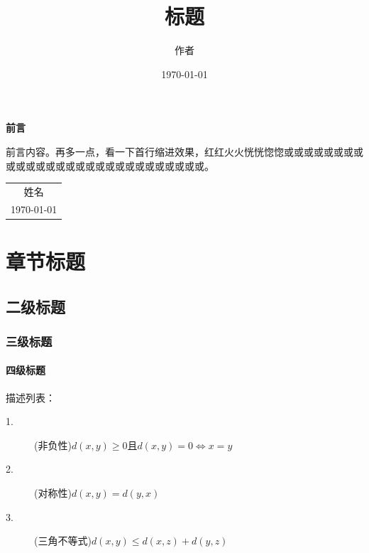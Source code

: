 \documentclass[12pt, a4paper, oneside]{ctexbook}
\title{\Huge{\textbf{标题}}} %
\author{作者} %
\date{\today} %
\begin{document}
    \maketitle

    \setcounter{page}{1}
    
    \begin{center}
        \Huge\textbf{前言}
    \end{center}
    
    前言内容。再多一点，看一下首行缩进效果，红红火火恍恍惚惚或或或或或或或或或或或或或或或或或或或或或或或或或或或或。

    \begin{flushright}
        \begin{tabular}{c}
            姓名\\
            \today
        \end{tabular}
    \end{flushright}

    \newpage

    \setcounter{page}{1}

    \tableofcontents

    \newpage

    \setcounter{page}{1}

    \chapter{章节标题}
    \section{二级标题}
    \subsection{三级标题}
    \subsubsection{四级标题}

    描述列表：
    \begin{description}
        \item[1.] (非负性)$d(x,y)\geqslant 0$且$d(x,y)=0\Leftrightarrow x=y$
        \item[2.] (对称性)$d(x,y)=d(y,x)$
        \item[3.] (三角不等式)$d(x,y)\leqslant d(x,z)+d(y,z)$
    \end{description}
\end{document}
